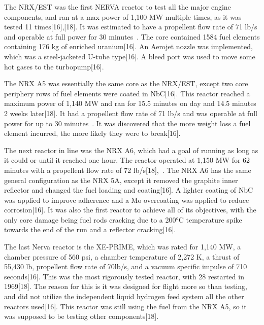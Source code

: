 \documentclass{article}
\begin{document}
    The NRX/EST was the first NERVA reactor to test all the major engine components, and ran at a max power of 1,100 MW multiple times, as it was tested 11 times[16],[18]. It was estimated to have a propellent flow rate of 71 lb/s and operable at full power for 30 minutes~\cite{ledbetter1969nerva}. The core contained 1584 fuel elements containing 176 kg of enriched uranium[16]. An Aerojet nozzle was implemented, which was a steel-jacketed U-tube type[16]. A bleed port was used to move some hot gases to the turbopump[16].


    The NRX A5 was essentially the same core as the NRX/EST, except two core periphery rows of fuel elements were coated in NbC[16]. This reactor reached a maximum power of 1,140 MW and ran for 15.5 minutes on day and 14.5 minutes 2 weeks later[18]. It had a propellent flow rate of 71 lb/s and was operable at full power for up to 30 minutes~\cite{ledbetter1969nerva}. It was discovered that the more weight loss a fuel element incurred, the more likely they were to break[16].


    The next reactor in line was the NRX A6, which had a goal of running as long as it could or until it reached one hour. The reactor operated at 1,150 MW for 62 minutes with a propellent flow rate of 72 lb/s[18],~\cite{ledbetter1969nerva}. The NRX A6 has the same general configuration as the NRX 5A, except it removed the graphite inner reflector and changed the fuel loading and coating[16]. A lighter coating of NbC was applied to improve adherence and a Mo overcoating was applied to reduce corrosion[16]. It was also the first reactor to achieve all of its objectives, with the only core damage being fuel rods cracking due to a 200°C temperature spike towards the end of the run and a reflector cracking[16].


    The last Nerva reactor is the XE-PRIME, which was rated for 1,140 MW, a chamber pressure of 560 psi, a chamber temperature of 2,272 K, a thrust of 55,430 lb, propellent flow rate of 70lb/s, and a vacuum specific impulse of 710 seconds[16]. This was the most rigorously tested reactor, with 28 restarted in 1969[18]. The reason for this is it was designed for flight more so than testing, and did not utilize the independent liquid hydrogen feed system all the other reactors used[16]. This reactor was still using the fuel from the NRX A5, so it was supposed to be testing other components[18].
\end{document}
